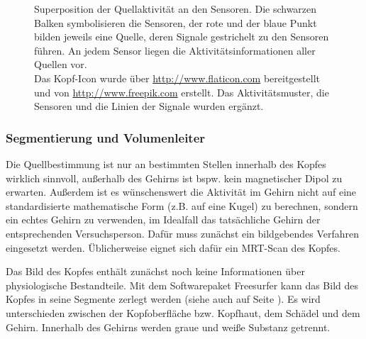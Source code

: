 \documentclass[doc,a4paper,12pt]{apa6}
\makeatletter
\DeclareRobustCommand*{\nameref}[1]{%
      \glqq{\myorg@nameref{#1}}\grqq%
    }%
\makeatother
\begin{document}
\begin{figure}
  \centering
    \setlength{\fboxsep}{8mm}
  \vspace*{3mm}
  \caption[Superposition der Quellaktivität an den Sensoren]{Superposition der Quellaktivität an den Sensoren. Die schwarzen Balken symbolisieren die Sensoren, der rote und der blaue Punkt bilden jeweils eine Quelle, deren Signale gestrichelt zu den Sensoren führen. An jedem Sensor liegen die Aktivitätsinformationen aller Quellen vor.\\ Das Kopf-Icon wurde über \url{http://www.flaticon.com} bereitgestellt und von \url{http://www.freepik.com} erstellt. Das Aktivitätsmuster, die Sensoren und die Linien der Signale wurden ergänzt.}
  \label{img:superposition}
\end{figure}

\subsubsection{Segmentierung und Volumenleiter}
\label{sec:segment}

Die Quellbestimmung ist nur an bestimmten Stellen innerhalb des Kopfes wirklich sinnvoll, außerhalb des Gehirns ist bspw. kein magnetischer Dipol zu erwarten. Außerdem ist es wünschenswert die Aktivität im Gehirn nicht auf eine standardisierte mathematische Form (z.B. auf eine Kugel) zu berechnen, sondern ein echtes Gehirn zu verwenden, im Idealfall das tatsächliche Gehirn der entsprechenden Versuchsperson. Dafür muss zunächst ein bildgebendes Verfahren eingesetzt werden. Üblicherweise eignet sich dafür ein MRT-Scan des Kopfes.

Das Bild des Kopfes enthält zunächst noch keine Informationen über physiologische Bestandteile. Mit dem Softwarepaket Freesurfer kann das Bild des Kopfes in seine Segmente zerlegt werden (siehe auch \nameref{sec:head-struct} auf Seite \pageref{sec:head-struct}). Es wird unterschieden zwischen der Kopfoberfläche bzw. Kopfhaut, dem Schädel und dem Gehirn. Innerhalb des Gehirns werden graue und weiße Substanz getrennt.
\end{document}

